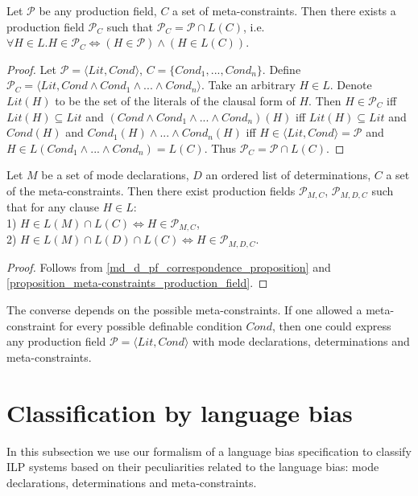 \begin{proposition}\label{proposition_meta-constraints_production_field}
Let $\mathcal{P}$ be any production field, $C$ a set of meta-constraints.
Then there exists a production field $\mathcal{P}_C$ such that
$\mathcal{P}_C=\mathcal{P} \cap L(C)$, i.e.
$\forall H \in L. H \in \mathcal{P}_C \iff (H \in \mathcal{P}) \land (H \in L(C))$.
\end{proposition}
\begin{proof}
Let $\mathcal{P}=\langle Lit, Cond \rangle$,
$C=\{Cond_1, ..., Cond_n\}$.
Define $\mathcal{P}_C=\langle Lit, Cond \land Cond_1 \land ... \land Cond_n \rangle$. Take an arbitrary $H \in L$. Denote $Lit(H)$ to be the set of the literals of the clausal form of $H$.
Then $H \in \mathcal{P}_C$ iff $Lit(H) \subseteq Lit$ and
$(Cond \land Cond_1 \land ... \land Cond_n)(H)$ iff
$Lit(H) \subseteq Lit$ and $Cond(H)$ and $Cond_1(H) \land ... \land Cond_n(H)$
iff $H \in \langle Lit, Cond \rangle = \mathcal{P}$ and $H \in L(Cond_1 \land ... \land Cond_n) = L(C)$. Thus $\mathcal{P}_C=\mathcal{P} \cap L(C)$.
\end{proof}

\begin{corollary}
Let $M$ be a set of mode declarations, $D$ an ordered list of determinations, $C$ a set of the meta-constraints.
Then there exist production fields
$\mathcal{P}_{M,C}$,
$\mathcal{P}_{M,D,C}$
such that for any clause $H \in L$:\\
1) $H \in L(M) \cap L(C) \iff H \in \mathcal{P}_{M,C}$,\\
2) $H \in L(M) \cap L(D) \cap L(C) \iff H \in \mathcal{P}_{M,D,C}$.\\
\end{corollary}
\begin{proof}
Follows from \ref{md_d_pf_correspondence_proposition} and \ref{proposition_meta-constraints_production_field}.
\end{proof}

The converse depends on the possible meta-constraints. If one allowed a meta-constraint for every possible definable condition $Cond$, then one could express any production field $\mathcal{P}=\langle Lit, Cond \rangle$ with mode declarations, determinations and meta-constraints.

\section{Classification by language bias}\label{sec:classification_language_bias}
In this subsection we use our formalism of a language bias specification to 
classify ILP systems based on their peculiarities related to the language bias: mode declarations, determinations and meta-constraints.

